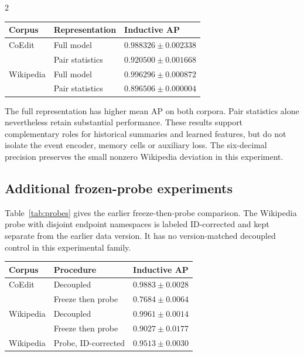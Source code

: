 \documentclass[a4paper,10pt,fleqn]{article}
\renewcommand{\small}{\fontsize{8}{12}\selectfont}
\begin{document}
\begin{multicols}{2}
\begin{center}
\begin{minipage}{\linewidth}\centering
{}\label{tab:backbone}
\small\setlength{\tabcolsep}{3pt}
\begin{tabular}{@{}lll@{}}
\toprule
Corpus & Representation & Inductive AP\\ \midrule
CoEdit & Full model & $0.988326\pm0.002338$\\
 & Pair statistics & $0.920500\pm0.001668$\\
Wikipedia & Full model & $0.996296\pm0.000872$\\
 & Pair statistics & $0.896506\pm0.000004$\\
\bottomrule
\end{tabular}
\end{minipage}
\end{center}

The full representation has higher mean AP on both corpora. Pair statistics alone nevertheless retain substantial performance. These results support complementary roles for historical summaries and learned features, but do not isolate the event encoder, memory cells or auxiliary loss. The six-decimal precision preserves the small nonzero Wikipedia deviation in this experiment.

\subsection{Additional frozen-probe experiments}
Table~\ref{tab:probes} gives the earlier freeze-then-probe comparison. The Wikipedia probe with disjoint endpoint namespaces is labeled ID-corrected and kept separate from the earlier data version. It has no version-matched decoupled control in this experimental family.

\begin{center}
\begin{minipage}{\linewidth}\centering
{}\label{tab:probes}
\small\setlength{\tabcolsep}{3pt}
\begin{tabular}{@{}lll@{}}
\toprule
Corpus & Procedure & Inductive AP\\ \midrule
CoEdit & Decoupled & $0.9883\pm0.0028$\\
 & Freeze then probe & $0.7684\pm0.0064$\\
Wikipedia & Decoupled & $0.9961\pm0.0014$\\
 & Freeze then probe & $0.9027\pm0.0177$\\
Wikipedia & Probe, ID-corrected & $0.9513\pm0.0030$\\
\bottomrule
\end{tabular}
\end{minipage}
\end{center}


\end{multicols}
\end{document}
